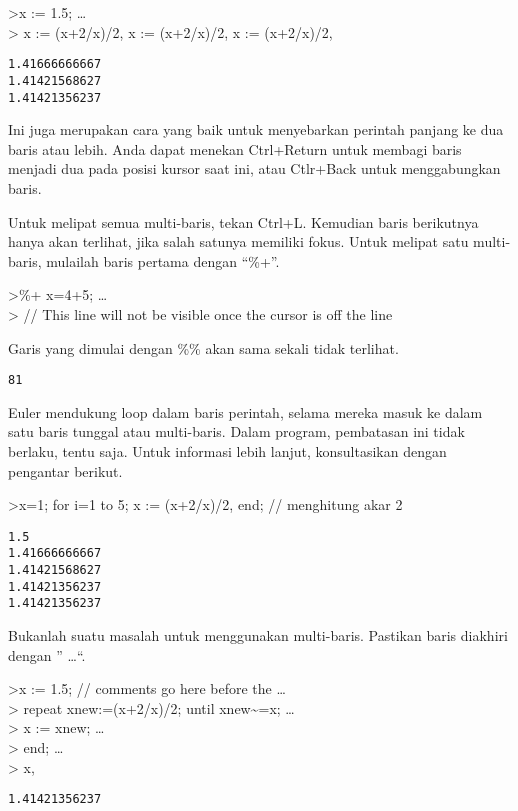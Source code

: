 \documentclass[
]{book}
\begin{document}
\textgreater x := 1.5; \ldots{}\\
\textgreater{} x := (x+2/x)/2, x := (x+2/x)/2, x := (x+2/x)/2,

\begin{verbatim}
1.41666666667
1.41421568627
1.41421356237
\end{verbatim}

Ini juga merupakan cara yang baik untuk menyebarkan perintah panjang ke dua baris atau lebih. Anda dapat menekan Ctrl+Return untuk membagi baris menjadi dua pada posisi kursor saat ini, atau Ctlr+Back untuk menggabungkan baris.

Untuk melipat semua multi-baris, tekan Ctrl+L. Kemudian baris berikutnya hanya akan terlihat, jika salah satunya memiliki fokus. Untuk melipat satu multi-baris, mulailah baris pertama dengan ``\%+''.

\textgreater\%+ x=4+5; \ldots{}\\
\textgreater{} // This line will not be visible once the cursor is off the line

Garis yang dimulai dengan \%\% akan sama sekali tidak terlihat.

\begin{verbatim}
81
\end{verbatim}

Euler mendukung loop dalam baris perintah, selama mereka masuk ke dalam satu baris tunggal atau multi-baris. Dalam program, pembatasan ini tidak berlaku, tentu saja. Untuk informasi lebih lanjut, konsultasikan dengan pengantar berikut.

\textgreater x=1; for i=1 to 5; x := (x+2/x)/2, end; // menghitung akar 2

\begin{verbatim}
1.5
1.41666666667
1.41421568627
1.41421356237
1.41421356237
\end{verbatim}

Bukanlah suatu masalah untuk menggunakan multi-baris. Pastikan baris diakhiri dengan '' \ldots``.

\textgreater x := 1.5; // comments go here before the \ldots{}\\
\textgreater{} repeat xnew:=(x+2/x)/2; until xnew\textasciitilde=x; \ldots{}\\
\textgreater{} x := xnew; \ldots{}\\
\textgreater{} end; \ldots{}\\
\textgreater{} x,

\begin{verbatim}
1.41421356237
\end{verbatim}
\end{document}
